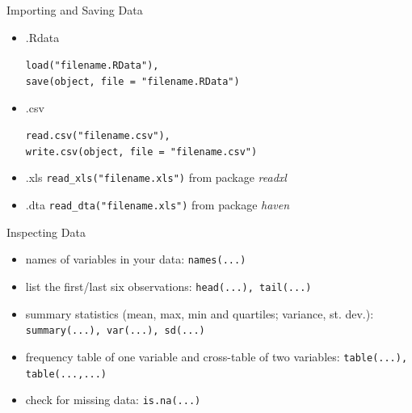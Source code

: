 \documentclass[9pt,aspectratio=169]{beamer}
\begin{document}
\begin{frame}{Importing and Saving Data}

        \begin{itemize}
    \item \color{teal} .Rdata\color{black} 
    
    \texttt{load("filename.RData"),\\ save(object, file = "filename.RData")}
    \item  \color{teal} .csv \color{black}
    
    \texttt{read.csv("filename.csv"),\\ write.csv(object, file = "filename.csv")}
    \item  \color{teal}.xls \color{black} \texttt{read\_xls("filename.xls")} from package \textit{readxl}
    \item  \color{teal}.dta  \color{black}\texttt{read\_dta("filename.xls")} from package \textit{haven}
\end{itemize}
\end{frame}


\begin{frame}{Inspecting Data}
\begin{itemize}
\item names of variables in your data: \texttt{names(...)}
    \item  list  the first/last six observations: \texttt{head(...), tail(...)}
     \item  summary statistics (mean, max, min and quartiles; variance, st. dev.): \texttt{summary(...), var(...), sd(...)}
     \item  frequency table of one variable and cross-table of two variables: \texttt{table(...), table(...,...)}
\item check for missing data: \texttt{is.na(...)}
\end{itemize}
\end{frame}
\end{document}
